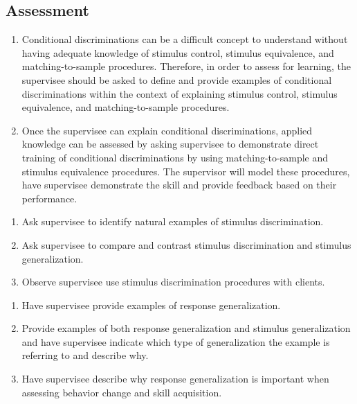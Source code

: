 \subsection{Assessment}
\begin{enumerate}
\item Conditional discriminations can be a difficult concept to understand without having adequate knowledge of stimulus control, stimulus equivalence, and matching-to-sample procedures.  Therefore, in order to assess for learning, the supervisee should be asked to define and provide examples of conditional discriminations within the context of explaining stimulus control, stimulus equivalence, and matching-to-sample procedures.
\item Once the supervisee can explain conditional discriminations, applied knowledge can be assessed by asking supervisee to demonstrate direct training of conditional discriminations by using matching-to-sample and stimulus equivalence procedures.  The supervisor will model these procedures, have supervisee demonstrate the skill and provide feedback based on their performance.  
%
\end{enumerate}
%
\begin{enumerate}
\item Ask supervisee to identify natural examples of stimulus discrimination.
\item Ask supervisee to compare and contrast stimulus discrimination and stimulus generalization.
\item Observe supervisee use stimulus discrimination procedures with clients.
\end{enumerate}
%
\begin{enumerate}
\item Have supervisee provide examples of response generalization.
\item Provide examples of both response generalization and stimulus generalization and have supervisee indicate which type of generalization the example is referring to and describe why.
\item Have supervisee describe why response generalization is important when assessing behavior change and skill acquisition.
%
\end{enumerate}

